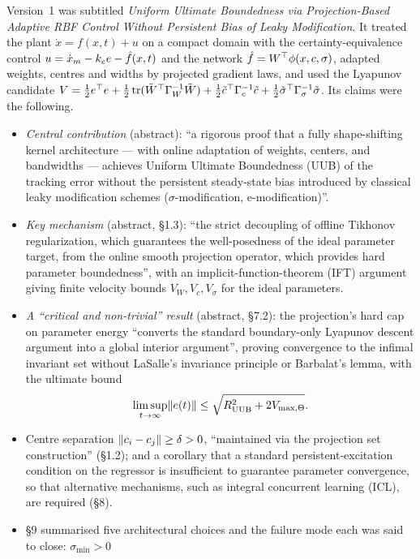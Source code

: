 Version~1 was subtitled \emph{Uniform Ultimate Boundedness via Projection-Based Adaptive RBF Control Without
Persistent Bias of Leaky Modification}. It treated the plant $\dot x = f(x,t) + u$ on a compact domain with the
certainty-equivalence control $u = \dot x_m - k_e e - \hat f(x,t)$ and the network $\hat f = W^\top\phi(x,c,\sigma)$,
adapted weights, centres and widths by projected gradient laws, and used the Lyapunov candidate
$V = \frac12 e^\top e + \frac12\operatorname{tr}(\tilde W^\top\Gamma_W^{-1}\tilde W) + \frac12\tilde c^\top\Gamma_c^{-1}\tilde c
+ \frac12\tilde\sigma^\top\Gamma_\sigma^{-1}\tilde\sigma$. Its claims were the following.
\begin{itemize}
  \item \emph{Central contribution} (abstract): ``a rigorous proof that a fully shape-shifting kernel architecture
    --- with online adaptation of weights, centers, and bandwidths --- achieves Uniform Ultimate Boundedness (UUB) of
    the tracking error without the persistent steady-state bias introduced by classical leaky modification schemes
    ($\sigma$-modification, e-modification)''.
  \item \emph{Key mechanism} (abstract, \S1.3): ``the strict decoupling of offline Tikhonov regularization, which
    guarantees the well-posedness of the ideal parameter target, from the online smooth projection operator, which
    provides hard parameter boundedness'', with an implicit-function-theorem (IFT) argument giving finite velocity
    bounds $V_W, V_c, V_\sigma$ for the ideal parameters.
  \item \emph{A ``critical and non-trivial'' result} (abstract, \S7.2): the projection's hard cap on parameter
    energy ``converts the standard boundary-only Lyapunov descent argument into a global interior argument'', proving
    convergence to the infimal invariant set without LaSalle's invariance principle or Barbalat's lemma, with the
    ultimate bound
    \[
      \limsup_{t\to\infty}\lVert e(t)\rVert \le \sqrt{R_{\mathrm{UUB}}^2 + 2V_{\max,\Theta}}.
    \]
  \item Centre separation $\lVert c_i - c_j\rVert \ge \delta > 0$, ``maintained via the projection set construction''
    (\S1.2); and a corollary that a standard persistent-excitation condition on the regressor is insufficient to
    guarantee parameter convergence, so that alternative mechanisms, such as integral concurrent learning (ICL), are
    required (\S8).
  \item \S9 summarised five architectural choices and the failure mode each was said to close: \mbox{$\sigma_{\min} > 0$}

\end{itemize}
